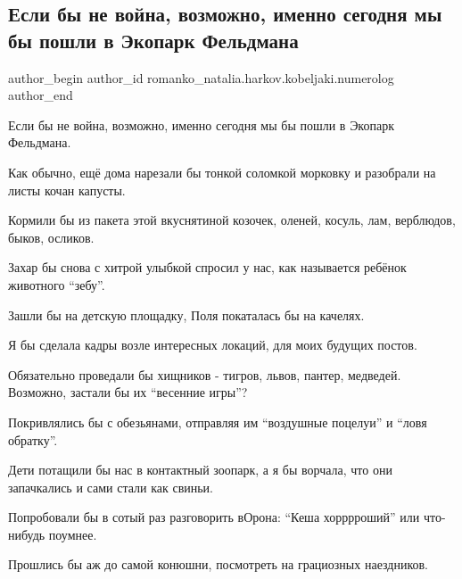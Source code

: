  
 
 
 
 
 
\subsection{Если бы не война, возможно, именно сегодня мы бы пошли в Экопарк Фельдмана}
\label{sec:10_04_2022.fb.romanko_natalia.harkov.kobeljaki.numerolog.1.ekopark_feldmana}
 
\ifcmt
 author_begin
   author_id romanko_natalia.harkov.kobeljaki.numerolog
 author_end
\fi

Если бы не война, возможно, именно сегодня мы бы пошли в Экопарк Фельдмана. 

Как обычно, ещё дома нарезали бы тонкой соломкой морковку и разобрали на листы
кочан капусты. 

Кормили бы из пакета этой вкуснятиной козочек, оленей, косуль, лам, верблюдов,
быков, осликов.

Захар бы снова с хитрой улыбкой спросил у нас, как называется ребёнок животного
\enquote{зебу}.

Зашли бы на детскую площадку, Поля покаталась бы на качелях. 

Я бы сделала кадры возле интересных локаций, для моих будущих постов. 

Обязательно проведали бы хищников - тигров, львов, пантер, медведей. Возможно,
застали бы их \enquote{весенние игры}?  

Покривлялись бы с обезьянами, отправляя им \enquote{воздушные поцелуи} и \enquote{ловя
обратку}. 

Дети потащили бы нас в контактный зоопарк, а я бы ворчала, что они запачкались
и сами стали как свиньи. 

Попробовали бы в сотый раз разговорить вОрона: \enquote{Кеша хорррроший} или что-нибудь
поумнее.

Прошлись бы аж до самой конюшни, посмотреть на грациозных наездников. 

